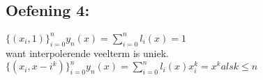 \documentclass[../Oefenzitting6.tex]{subfiles}
\begin{document}
  \subsection{Oefening 4:}

  $
    \{ (x_{i}, 1) \}_{i=0}^{n}
    y_{n}(x) = \sum_{i=0}^{n} l_{i}(x) = 1
  $
    \\ want interpolerende veelterm is uniek.
  $
    \{ (x_{i}, x-{i}^{k}) \}_{i=0}^{n}
    y_{n}(x) = \sum_{i=0}^{n} l_{i}(x)x_{i}^{k} = x^{k} als k \leq n
  $
\end{document}
